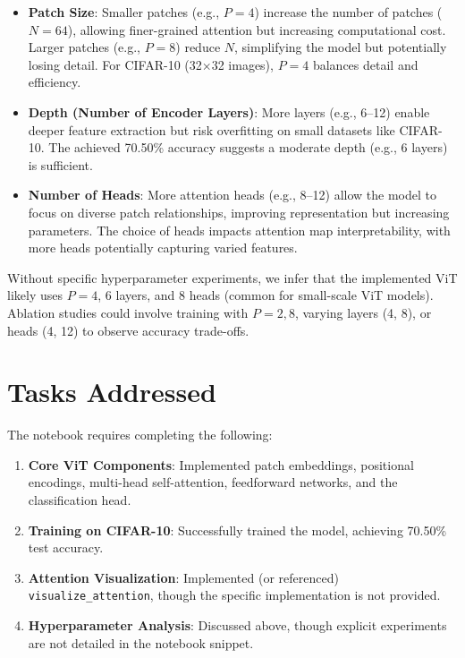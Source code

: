 \documentclass{article}
\begin{document}
\begin{itemize}
    \item \textbf{Patch Size}: Smaller patches (e.g., \( P=4 \)) increase the number of patches (\( N=64 \)), allowing finer-grained attention but increasing computational cost. Larger patches (e.g., \( P=8 \)) reduce \( N \), simplifying the model but potentially losing detail. For CIFAR-10 (32×32 images), \( P=4 \) balances detail and efficiency.
    \item \textbf{Depth (Number of Encoder Layers)}: More layers (e.g., 6–12) enable deeper feature extraction but risk overfitting on small datasets like CIFAR-10. The achieved 70.50\% accuracy suggests a moderate depth (e.g., 6 layers) is sufficient.
    \item \textbf{Number of Heads}: More attention heads (e.g., 8–12) allow the model to focus on diverse patch relationships, improving representation but increasing parameters. The choice of heads impacts attention map interpretability, with more heads potentially capturing varied features.
\end{itemize}

Without specific hyperparameter experiments, we infer that the implemented ViT likely uses \( P=4 \), 6 layers, and 8 heads (common for small-scale ViT models). Ablation studies could involve training with \( P=2, 8 \), varying layers (4, 8), or heads (4, 12) to observe accuracy trade-offs.

\section{Tasks Addressed}
The notebook requires completing the following:

\begin{enumerate}
    \item \textbf{Core ViT Components}: Implemented patch embeddings, positional encodings, multi-head self-attention, feedforward networks, and the classification head.
    \item \textbf{Training on CIFAR-10}: Successfully trained the model, achieving 70.50\% test accuracy.
    \item \textbf{Attention Visualization}: Implemented (or referenced) \texttt{visualize\_attention}, though the specific implementation is not provided.
    \item \textbf{Hyperparameter Analysis}: Discussed above, though explicit experiments are not detailed in the notebook snippet.
\end{enumerate}
\end{document}
